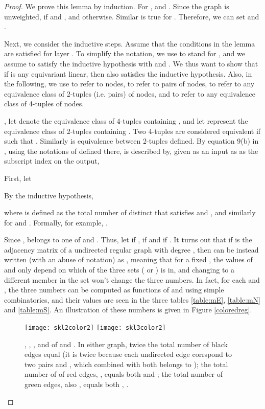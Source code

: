 \documentclass{article}
\begin{document}
\begin{proof}
We prove this lemma by induction. For ,  and . Since the graph is unweighted,  if  and , and  otherwise. Similar is true for . Therefore, we can set  and .

Next, we consider the inductive steps. Assume that the conditions in the lemma are satisfied for layer . To simplify the notation, we use  to stand for , and we assume to satisfy the inductive hypothesis with  and . We thus want to show that if  is any equivariant linear, then  also satisfies the inductive hypothesis. Also, in the following, we use  to refer to nodes,  to refer to pairs of nodes,  to refer to any equivalence class of 2-tuples (i.e. pairs) of nodes, and  to refer to any equivalence class of 4-tuples of nodes.



, let  denote the equivalence class of 4-tuples containing , and let  represent the equivalence class of 2-tuples containing . 
Two 4-tuples  are considered equivalent if  such that . Similarly is equivalence between 2-tuples defined. By equation 9(b) in \cite{maron2018invariant}, using the notations of  defined there,  is described by, given  as an input as  as the subscript index on the output,

 


First, let 

By the inductive hypothesis, 

where  is defined as the total number of distinct  that satisfies  and , and similarly for  and . Formally, for example, .

Since ,  belongs to one of  and . Thus, let  if ,  if  and  if . It turns out that if  is the adjacency matrix of a undirected regular graph with degree , then  can be instead written (with an abuse of notation) as , meaning that for a fixed , the values of  and  only depend on which of the three sets ( or )  is in, and changing  to a different member in the set  won't change the three numbers. In fact, for each  and , the three numbers can be computed as functions of  and  using simple combinatorics, and their values are seen in the three tables \ref{table:mE}, \ref{table:mN} and \ref{table:mS}. An illustration of these numbers is given in Figure \ref{coloredreg}.
\begin{figure}
\label{coloredreg}
    \centering
    \texttt{[image: skl2color2]}
    \texttt{[image: skl3color2]}
    \caption{, , ,  and  of  and . In either graph, twice the total number of black edges equal  (it is twice because each undirected edge corrspond to two pairs  and , which combined with  both belongs to ); the total number of of red edges, , equals both  and ; the total number of green edges, also , equals both , .}
    \label{fig:my_label}
\end{figure}


\end{proof}
\end{document}

